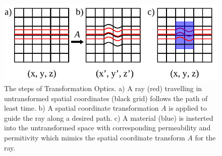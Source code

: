 \documentclass[11pt]{iopart}
\begin{document}
\begin{figure}
  \begin{center}
   \noindent\includegraphics[width=0.75\linewidth]{images/trans_Opt_edit.pdf}
  \end{center}
  \caption{The steps of Transformation Optics. a) A ray (red)
    travelling in untransformed spatial coordinates (black grid)
    follows the path of least time. b) A spatial coordinate
    transformation $A$ is applied to guide the ray along a desired
    path. c) A material (blue) is insterted into the untransformed
    space with corresponding permeability and permitivity which mimics
    the spatial coordinate transform $A$ for the ray. }
  \label{fig:TO}
\end{figure}
\end{document}
